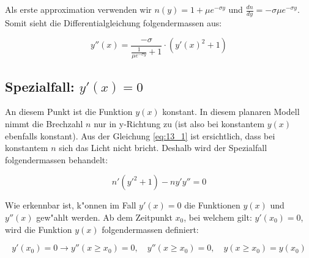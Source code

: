 Als erste approximation verwenden wir $n(y) = 1 + \mu e^{-\sigma y}$ und $\frac{dn}{dy} = -\sigma \mu e^{-\sigma y}$.
Somit sieht die Differentialgleichung folgendermassen aus:

\begin{equation} \label{eq:planar_DGL_n}
y''(x) = \frac{-\sigma}{\frac{1}{\mu e^{-\sigma y}} + 1} \cdot \left( y'(x)^2 + 1 \right)
\end{equation}

\subsection{Spezialfall: $y'(x) = 0$} \label{ch:spezialfall}

An diesem Punkt ist die Funktion $y(x)$ konstant. 
In diesem planaren Modell nimmt die Brechzahl $n$ nur in y-Richtung zu (ist also bei konstantem $y(x)$ ebenfalls konstant).
Aus der Gleichung \ref{eq:13_1} ist ersichtlich, dass bei konstantem $n$ sich das Licht nicht bricht. 
Deshalb wird der Spezialfall folgendermassen behandelt:

$$n' (y'^2 + 1) - n y' y'' = 0$$

Wie erkennbar ist, k"onnen im Fall $y'(x) = 0$ die Funktionen $y(x)$ und $y''(x)$ gew"ahlt werden. 
Ab dem Zeitpunkt $x_0$, bei welchem gilt: $y'(x_0) = 0$, wird die Funktion $y(x)$ folgendermassen definiert:

$$y'(x_0) = 0 \longrightarrow y''(x \geq x_0) = 0, \quad y''(x \geq x_0) = 0, \quad  y(x \geq x_0) = y(x_0)$$

